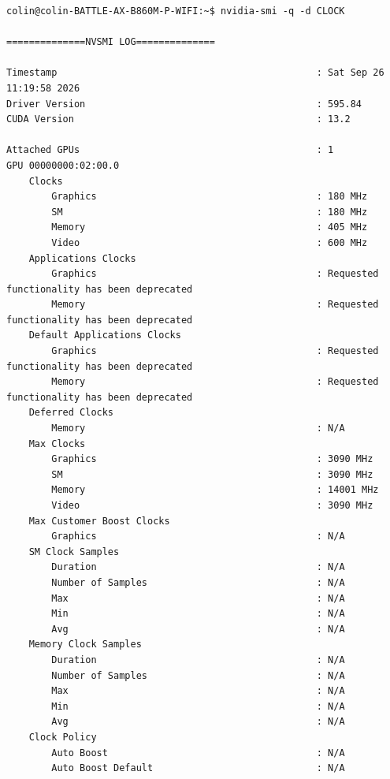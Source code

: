 \begin{lstlisting}
colin@colin-BATTLE-AX-B860M-P-WIFI:~$ nvidia-smi -q -d CLOCK

==============NVSMI LOG==============

Timestamp                                              : Sat Sep 26 11:19:58 2026
Driver Version                                         : 595.84
CUDA Version                                           : 13.2

Attached GPUs                                          : 1
GPU 00000000:02:00.0
    Clocks
        Graphics                                       : 180 MHz
        SM                                             : 180 MHz
        Memory                                         : 405 MHz
        Video                                          : 600 MHz
    Applications Clocks
        Graphics                                       : Requested functionality has been deprecated
        Memory                                         : Requested functionality has been deprecated
    Default Applications Clocks
        Graphics                                       : Requested functionality has been deprecated
        Memory                                         : Requested functionality has been deprecated
    Deferred Clocks
        Memory                                         : N/A
    Max Clocks
        Graphics                                       : 3090 MHz
        SM                                             : 3090 MHz
        Memory                                         : 14001 MHz
        Video                                          : 3090 MHz
    Max Customer Boost Clocks
        Graphics                                       : N/A
    SM Clock Samples
        Duration                                       : N/A
        Number of Samples                              : N/A
        Max                                            : N/A
        Min                                            : N/A
        Avg                                            : N/A
    Memory Clock Samples
        Duration                                       : N/A
        Number of Samples                              : N/A
        Max                                            : N/A
        Min                                            : N/A
        Avg                                            : N/A
    Clock Policy
        Auto Boost                                     : N/A
        Auto Boost Default                             : N/A
\end{lstlisting}

